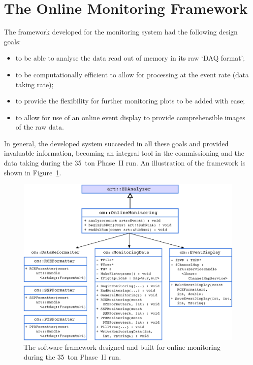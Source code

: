 
\section{The Online Monitoring Framework}\label{sec:OnlineMonitoring}

The framework developed for the monitoring system had the following design goals:
\begin{itemize}
\item to be able to analyse the data read out of memory in its raw `DAQ format';
\item to be computationally efficient to allow for processing at the event rate (data taking rate);
\item to provide the flexibility for further monitoring plots to be added with ease;
\item to allow for use of an online event display to provide comprehensible images of the raw data.
\end{itemize}
In general, the developed system succeeded in all these goals and provided invaluable information, becoming an integral tool in the commissioning and the data taking during the 35~ton Phase~II run.  An illustration of the framework is shown in Figure~\ref{fig:OnlineMonitoringFramework}.

\begin{figure}
  \centering
  \includegraphics[width=12cm]{softwareFramework.eps}
  \caption[The software framework designed and built for online monitoring during the 35~ton Phase~II run.]{The software framework designed and built for online monitoring during the 35~ton Phase~II run.}
  \label{fig:OnlineMonitoringFramework}
\end{figure}

